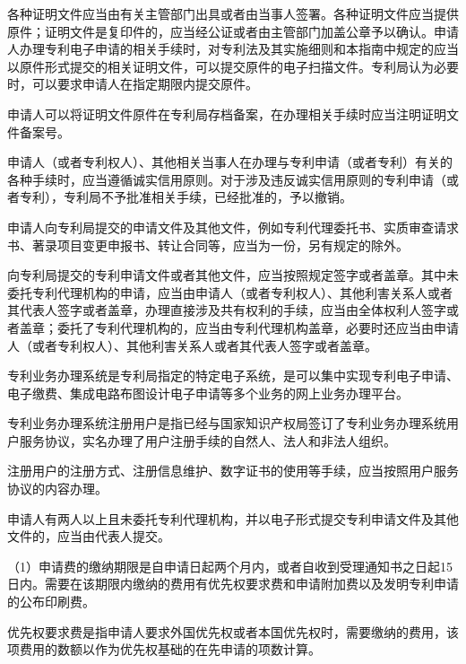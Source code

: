 各种证明文件应当由有关主管部门出具或者由当事人签署。各种证明文件应当提供原件；证明文件是复印件的，应当经公证或者由主管部门加盖公章予以确认。申请人办理专利电子申请的相关手续时，对专利法及其实施细则和本指南中规定的应当以原件形式提交的相关证明文件，可以提交原件的电子扫描文件。专利局认为必要时，可以要求申请人在指定期限内提交原件。

申请人可以将证明文件原件在专利局存档备案，在办理相关手续时应当注明证明文件备案号。

申请人（或者专利权人）、其他相关当事人在办理与专利申请（或者专利）有关的各种手续时，应当遵循诚实信用原则。对于涉及违反诚实信用原则的专利申请（或者专利），专利局不予批准相关手续，已经批准的，予以撤销。

申请人向专利局提交的申请文件及其他文件，例如专利代理委托书、实质审查请求书、著录项目变更申报书、转让合同等，应当为一份，另有规定的除外。

向专利局提交的专利申请文件或者其他文件，应当按照规定签字或者盖章。其中未委托专利代理机构的申请，应当由申请人（或者专利权人）、其他利害关系人或者其代表人签字或者盖章，办理直接涉及共有权利的手续，应当由全体权利人签字或者盖章；委托了专利代理机构的，应当由专利代理机构盖章，必要时还应当由申请人（或者专利权人）、其他利害关系人或者其代表人签字或者盖章。

专利业务办理系统是专利局指定的特定电子系统，是可以集中实现专利电子申请、电子缴费、集成电路布图设计电子申请等多个业务的网上业务办理平台。

专利业务办理系统注册用户是指已经与国家知识产权局签订了专利业务办理系统用户服务协议，实名办理了用户注册手续的自然人、法人和非法人组织。

注册用户的注册方式、注册信息维护、数字证书的使用等手续，应当按照用户服务协议的内容办理。

申请人有两人以上且未委托专利代理机构，并以电子形式提交专利申请文件及其他文件的，应当由代表人提交。

{\setlength{\parindent}{17.1bp}（1）申请费的缴纳期限是自申请日起两个月内，或者自收到受理通知书之日起15日内。需要在该期限内缴纳的费用有优先权要求费和申请附加费以及发明专利申请的公布印刷费。\par}

优先权要求费是指申请人要求外国优先权或者本国优先权时，需要缴纳的费用，该项费用的数额以作为优先权基础的在先申请的项数计算。

